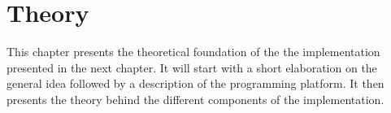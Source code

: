 \chapter{Theory}
\label{chap:theory}




















This chapter presents the theoretical foundation of the the implementation presented in the next chapter.
It will start with a short elaboration on the general idea followed by a description of the
programming platform.
It then presents the theory behind the different components of the implementation.

